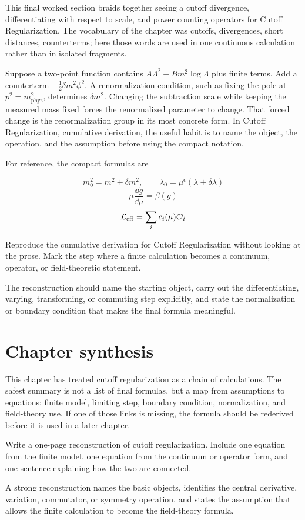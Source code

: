 This final worked section braids together seeing a cutoff divergence, differentiating with respect to scale, and power counting operators for Cutoff Regularization.  The vocabulary of the chapter was cutoffs, divergences, short distances, counterterms; here those words are used in one continuous calculation rather than in isolated fragments.

Suppose a two-point function contains \(A\Lambda^2+B m^2\log\Lambda\) plus finite terms.  Add a counterterm \(-\frac12\delta m^2\phi^2\).  A renormalization condition, such as fixing the pole at \(p^2=m_{\mathrm{phys}}^2\), determines \(\delta m^2\).  Changing the subtraction scale while keeping the measured mass fixed forces the renormalized parameter to change.  That forced change is the renormalization group in its most concrete form.  In Cutoff Regularization, cumulative derivation, the useful habit is to name the object, the operation, and the assumption before using the compact notation.

For reference, the compact formulas are

\[
  m_0^2=m^2+\delta m^2,\qquad \lambda_0=\mu^\epsilon(\lambda+\delta\lambda)
\]
\[
  \mu\frac{\dd g}{\dd\mu}=\beta(g)
\]
\[
  \mathcal L_{\mathrm{eff}}=\sum_i c_i(\mu)\mathcal O_i
\]

\begin{exercise}
Reproduce the cumulative derivation for Cutoff Regularization without looking at the prose.  Mark the step where a finite calculation becomes a continuum, operator, or field-theoretic statement.
\begin{answer}
The reconstruction should name the starting object, carry out the differentiating, varying, transforming, or commuting step explicitly, and state the normalization or boundary condition that makes the final formula meaningful.
\end{answer}
\end{exercise}



\section{Chapter synthesis}

This chapter has treated cutoff regularization as a chain of calculations.  The safest summary is not a list of final formulas, but a map from assumptions to equations: finite model, limiting step, boundary condition, normalization, and field-theory use.  If one of those links is missing, the formula should be rederived before it is used in a later chapter.

\begin{exercise}
Write a one-page reconstruction of cutoff regularization.  Include one equation from the finite model, one equation from the continuum or operator form, and one sentence explaining how the two are connected.
\begin{answer}
A strong reconstruction names the basic objects, identifies the central derivative, variation, commutator, or symmetry operation, and states the assumption that allows the finite calculation to become the field-theory formula.
\end{answer}
\end{exercise}

